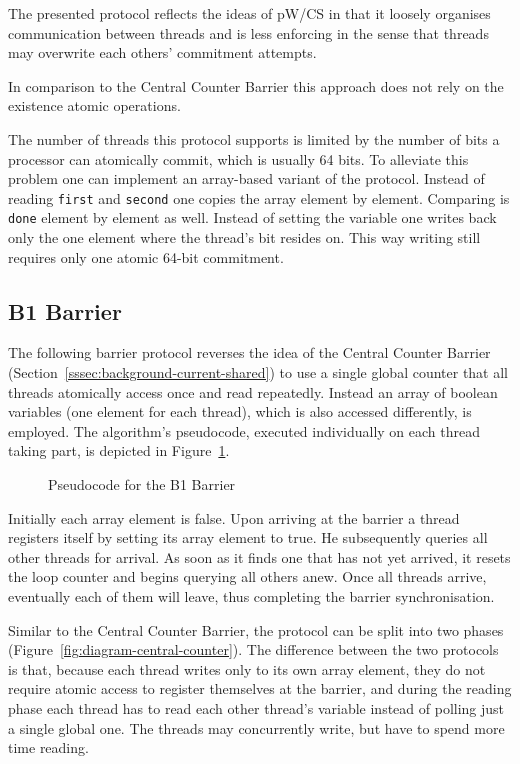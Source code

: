 \documentclass[a4paper, 10pt]{article}
\begin{document}
The presented protocol reflects the ideas of pW/CS in that it loosely organises communication between threads and is less enforcing in the sense that threads may overwrite each others' commitment attempts.

In comparison to the Central Counter Barrier this approach does not rely on the existence atomic operations.

The number of threads this protocol supports is limited by the number of bits a processor can atomically commit, which is usually 64 bits. To alleviate this problem one can implement an array-based variant of the protocol. Instead of reading \texttt{first} and \texttt{second} one copies the array element by element. Comparing is \texttt{done} element by element as well. Instead of setting the variable one writes back only the one element where the thread's bit resides on. This way writing still requires only one atomic 64-bit commitment.

\subsection{B1 Barrier}
\label{ssec:new-b1}

The following barrier protocol reverses the idea of the Central Counter Barrier (Section~\ref{sssec:background-current-shared}) to use a single global counter that all threads atomically access once and read repeatedly. Instead an array of boolean variables (one element for each thread), which is also accessed differently, is employed.
The algorithm's pseudocode, executed individually on each thread taking part, is depicted in Figure~\ref{fig:pseudocode-b1}.

\begin{figure}[htbp]
	\centering
	
	\caption{Pseudocode for the B1 Barrier}
	\label{fig:pseudocode-b1}
\end{figure}

Initially each array element is false. Upon arriving at the barrier a thread registers itself by setting its array element to true. He subsequently queries all other threads for arrival. As soon as it finds one that has not yet arrived, it resets the loop counter and begins querying all others anew. Once all threads arrive, eventually each of them will leave, thus completing the barrier synchronisation.

Similar to the Central Counter Barrier, the protocol can be split into two phases (Figure~\ref{fig:diagram-central-counter}).
The difference between the two protocols is that, because each thread writes only to its own array element, they do not require atomic access to register themselves at the barrier, and during the reading phase each thread has to read each other thread's variable instead of polling just a single global one. The threads may concurrently write, but have to spend more time reading.
\end{document}
